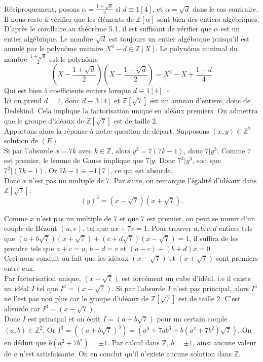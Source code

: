 \documentclass{article}
\newcommand{\bZ}{\mathbb{Z}}
\begin{document}
Réciproquement, posons \( \alpha = \frac{1 + \sqrt{d}}{2} \) si \( d \equiv 1 [4] \), et \( \alpha = \sqrt{d} \) dans le cas contraire. Il nous reste à vérifier que les éléments de \( \mathbb{Z}[\alpha] \) sont bien des entiers algébriques. D’après le corollaire au théorème 5.1, il est suffisant de vérifier que \( \alpha \) est un entier algébrique. Le nombre \( \sqrt{d} \) est toujours un entier algébrique puisqu’il est annulé par le polynôme unitaire \( X^2 - d \in \mathbb{Z}[X] \). Le polynôme minimal du nombre \( \frac{1 + \sqrt{d}}{2} \) est le polynôme
\[ \left( X - \frac{1 + \sqrt{d}}{2} \right) \left( X - \frac{1 - \sqrt{d}}{2} \right) = X^2 - X + \frac{1 - d}{4} \]
    Qui est bien à coefficients entiers lorsque $d\equiv 1[4]$. $\square$\\

Ici on prend $d = 7$, donc $d\equiv 3[4]$ et $\bZ[\sqrt{7}]$ est un anneau d'entiers, donc de Dedekind. Cela implique la factorisation unique en idéaux premiers. On admettra que le groupe d'idéaux de $\bZ[\sqrt{7}]$ est de taille $2$.\\


Apportons alors la réponse à notre question de départ. Supposons $(x,y)\in \bZ^2$ solution de $(E)$.\\
Si par l'absurde $x = 7k$ avec $k\in \bZ$, alors $y^3 = 7(7k-1)$, donc $7|y^3$. Comme $7$ est premier, le lemme de Gauss implique que $7|y$. Donc $7^3|y^3$, soit que $7^2|(7k-1)$. Or $7k-1\equiv -1[7]$, ce qui est absurde.\\
Donc $x$ n'est pas un multiple de $7$. Par suite, on remarque l'égalité d'idéaux dans $\bZ[\sqrt{7}]$:
\[(y)^3 = (x-\sqrt{7})(x+\sqrt{7}).\]

Comme $x$ n'est pas un multiple de $7$ et que $7$ est premier, on peut se munir d'un couple de Bézout $(u,v)$, tel que $ux + 7v = 1$.
Pour trouver $a,b,c,d$ entiers tels que $(a+b\sqrt{7})(x+\sqrt{7}) + (c+d\sqrt{7})(x-\sqrt{7}) = 1$, il suffira de les prendre tels que $a+c = u$, $b-d = v$ et $(a-c) + (b+d)x = 0$.\\
Ceci nous conduit au fait que les idéaux $(x-\sqrt{7})$ et $(x+\sqrt{7})$ sont premiers entre eux.\\

Par factorisation unique, $(x-\sqrt{7})$ est forcément un cube d'idéal, i.e il existe un idéal $I$ tel que $I^3 = (x-\sqrt{7})$. Si par l'absurde $I$ n'est pas principal, alors $I^3$ ne l'est pas non plus car le groupe d'idéaux de $\bZ[\sqrt{7}]$ est de taille $2$. C'est absurde car $I^3 = (x-\sqrt{7})$.\\
Donc $I$ est principal et on écrit $I = (a+b\sqrt{7})$ pour un certain couple $(a,b)\in \bZ^2$. Or $I^3 = \left((a+b\sqrt{7})^3\right) = (a^3+7ab^3 + b(a^2 + 7b^2)\sqrt{7})$. On en déduit que $b(a^2+7b^2) = \pm 1$. Par calcul dans $\bZ$, $b = \pm 1$, ainsi aucune valeur de $a$ n'est satisfaisante.
On en conclut qu'il n'existe aucune solution dans $\bZ$.\\
\end{document}
